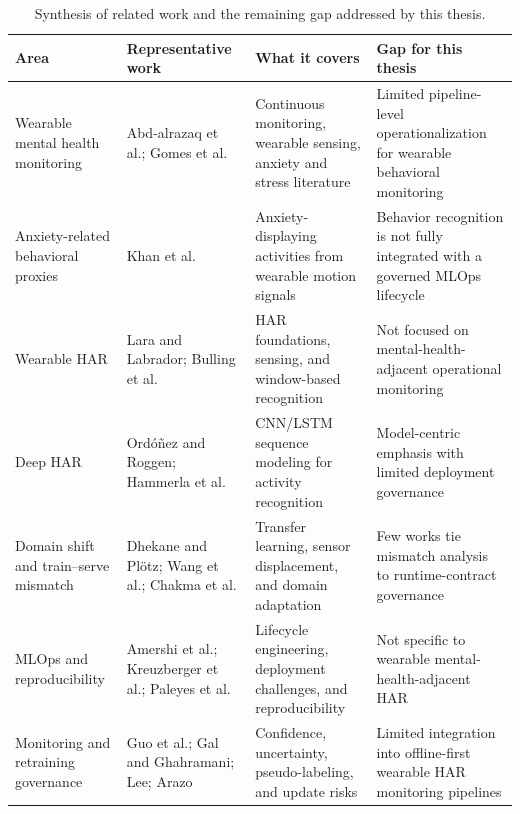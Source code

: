 \begin{table}[htbp]
\centering
\small
\caption{Synthesis of related work and the remaining gap addressed by this thesis.}
\label{tab:related_work_synthesis}
\begin{tabular}{p{3.0cm} p{3.2cm} p{4.1cm} p{4.1cm}}
\hline
\textbf{Area} & \textbf{Representative work} & \textbf{What it covers} & \textbf{Gap for this thesis} \\
\hline

Wearable mental health monitoring
& Abd-alrazaq et al.; Gomes et al.
& Continuous monitoring, wearable sensing, anxiety and stress literature
& Limited pipeline-level operationalization for wearable behavioral monitoring \\

Anxiety-related behavioral proxies
& Khan et al.
& Anxiety-displaying activities from wearable motion signals
& Behavior recognition is not fully integrated with a governed MLOps lifecycle \\

Wearable HAR
& Lara and Labrador; Bulling et al.
& HAR foundations, sensing, and window-based recognition
& Not focused on mental-health-adjacent operational monitoring \\

Deep HAR
& Ordóñez and Roggen; Hammerla et al.
& CNN/LSTM sequence modeling for activity recognition
& Model-centric emphasis with limited deployment governance \\

Domain shift and train--serve mismatch
& Dhekane and Plötz; Wang et al.; Chakma et al.
& Transfer learning, sensor displacement, and domain adaptation
& Few works tie mismatch analysis to runtime-contract governance \\

MLOps and reproducibility
& Amershi et al.; Kreuzberger et al.; Paleyes et al.
& Lifecycle engineering, deployment challenges, and reproducibility
& Not specific to wearable mental-health-adjacent HAR \\

Monitoring and retraining governance
& Guo et al.; Gal and Ghahramani; Lee; Arazo
& Confidence, uncertainty, pseudo-labeling, and update risks
& Limited integration into offline-first wearable HAR monitoring pipelines \\

\hline
\end{tabular}
\end{table}